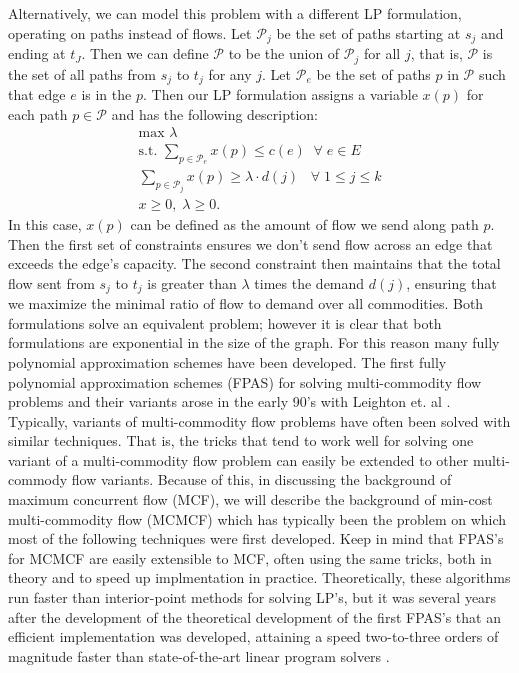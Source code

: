 Alternatively, we can model this problem with a
different LP formulation, operating on paths instead of flows. Let
$\mathcal{P}_j$ be the set of paths starting at $s_j$ and ending at
$t_J$.
Then we can define $\mathcal{P}$ to be the union of $\mathcal{P}_j$
for all $j$, that is, $\mathcal{P}$ is the set of all paths from $s_j$
to $t_j$ for any $j$. Let $\mathcal{P}_e$ be the set of paths $p$ in
$\mathcal{P}$ such that edge $e$ is in the $p$. Then our LP
formulation assigns a variable $x(p)$ for each path $p\in \mathcal{P}$
and has the following description:
\begin{align*}
\text{max     } \lambda \\
\text{s.t. }\sum_{p\in \mathcal{P}_e}x(p) \leq c(e) \;\;\forall\;
e\in E \\
\sum_{p\in \mathcal{P}_j} x(p)\geq \lambda\cdot d(j) \;\;\;\forall \;1\leq j\leq k \\
x\geq 0,\; \lambda\geq 0.
\end{align*}
In this case, $x(p)$ can be defined as the amount of flow we send
along path $p$. Then the first set of constraints ensures we don't
send flow across an edge that exceeds the edge's capacity. The second
constraint then maintains that the total flow sent from $s_j$ to $t_j$
is greater than $\lambda$ times the demand $d(j)$, ensuring that we
maximize the minimal ratio of flow to demand over all commodities. Both formulations solve an equivalent problem; however
it is clear that both formulations are exponential in the size of the graph. For this
reason many fully polynomial approximation schemes have been
developed. 
The first fully polynomial approximation schemes (FPAS) for solving
multi-commodity flow problems and their variants arose in the early
90's with Leighton et. al \cite{leighton}.
Typically, variants of multi-commodity flow problems have often been
solved with similar techniques. That is, the tricks that tend to work
well for solving one variant of a multi-commodity flow problem can
easily be extended to other multi-commody flow variants. Because of this, in discussing the background of maximum concurrent flow (MCF),
we will describe the background of min-cost multi-commodity flow
(MCMCF) which has typically been the problem on which most of the
following techniques were first developed. Keep in mind that FPAS's
for MCMCF are easily extensible to MCF, often using the same tricks,
both in theory and to speed up implmentation in
practice.
Theoretically, these algorithms run faster than
interior-point methods for solving LP's, but it was several years
after the development of the theoretical development of
the first FPAS's that an efficient implementation was developed,
attaining a speed two-to-three orders of magnitude faster than
state-of-the-art linear program solvers \cite{goldberg}.

